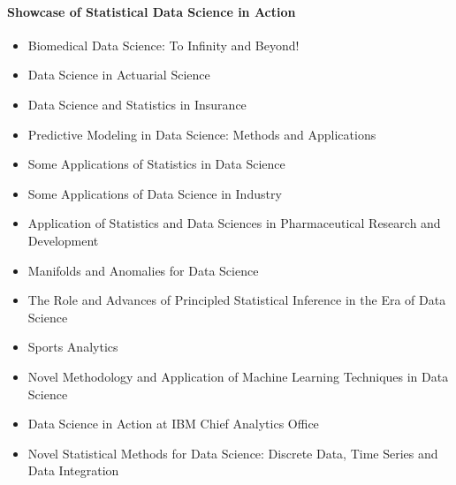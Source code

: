 \documentclass[12pt]{article}
\begin{document}
\paragraph{Showcase of Statistical Data Science in Action}
\begin{itemize}
\item
  Biomedical Data Science: To Infinity and Beyond!

\item
  Data Science in Actuarial Science

\item
  Data Science and Statistics in Insurance

\item
  Predictive Modeling in Data Science: Methods and Applications

\item
  Some Applications of Statistics in Data Science

\item
  Some Applications of Data Science in Industry

\item
  Application of Statistics and Data Sciences in Pharmaceutical
  Research and Development

\item
  Manifolds and Anomalies for Data Science

\item
  The Role and Advances of Principled Statistical Inference in the Era
  of Data Science

\item
  Sports Analytics %

\item
  Novel Methodology and Application of Machine Learning Techniques in
  Data Science

\item
  Data Science in Action at IBM Chief Analytics Office

\item
  Novel Statistical Methods for Data Science: Discrete Data, Time
  Series and Data Integration


\end{itemize}
\end{document}
